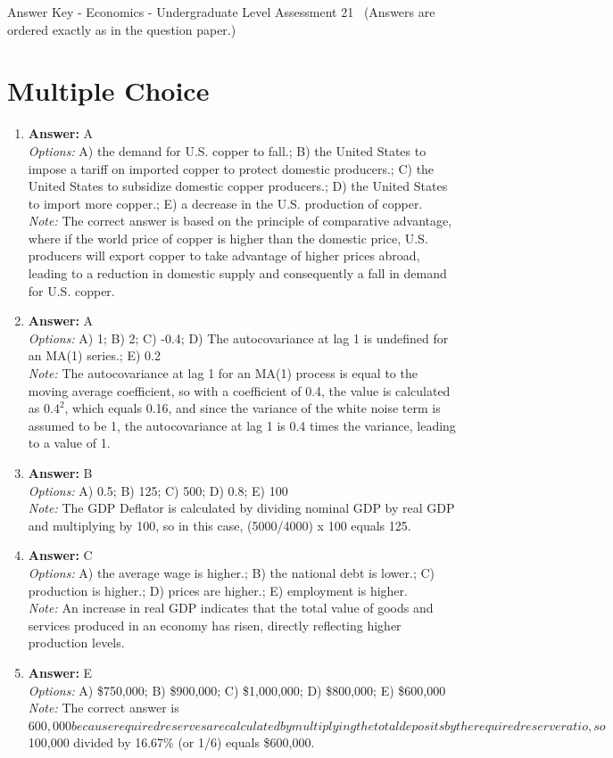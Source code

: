 \documentclass[12pt]{article}
\begin{document}
\begin{center}
Answer Key - Economics - Undergraduate Level Assessment 21 \
\small (Answers are ordered exactly as in the question paper.)
\end{center}

\section*{Multiple Choice}
\begin{enumerate}[label=\arabic*.]
\item \textbf{Answer:} A
\\ \textit{Options:} A) the demand for U.S. copper to fall.; B) the United States to impose a tariff on imported copper to protect domestic producers.; C) the United States to subsidize domestic copper producers.; D) the United States to import more copper.; E) a decrease in the U.S. production of copper.
\\ \textit{Note:} The correct answer is based on the principle of comparative advantage, where if the world price of copper is higher than the domestic price, U.S. producers will export copper to take advantage of higher prices abroad, leading to a reduction in domestic supply and consequently a fall in demand for U.S. copper.
\item \textbf{Answer:} A
\\ \textit{Options:} A) 1; B) 2; C) -0.4; D) The autocovariance at lag 1 is undefined for an MA(1) series.; E) 0.2
\\ \textit{Note:} The autocovariance at lag 1 for an MA(1) process is equal to the moving average coefficient, so with a coefficient of 0.4, the value is calculated as 0.$4^2$, which equals 0.16, and since the variance of the white noise term is assumed to be 1, the autocovariance at lag 1 is 0.4 times the variance, leading to a value of 1.
\item \textbf{Answer:} B
\\ \textit{Options:} A) 0.5; B) 125; C) 500; D) 0.8; E) 100
\\ \textit{Note:} The GDP Deflator is calculated by dividing nominal GDP by real GDP and multiplying by 100, so in this case, (5000/4000) x 100 equals 125.
\item \textbf{Answer:} C
\\ \textit{Options:} A) the average wage is higher.; B) the national debt is lower.; C) production is higher.; D) prices are higher.; E) employment is higher.
\\ \textit{Note:} An increase in real GDP indicates that the total value of goods and services produced in an economy has risen, directly reflecting higher production levels.
\item \textbf{Answer:} E
\\ \textit{Options:} A) \$750,000; B) \$900,000; C) \$1,000,000; D) \$800,000; E) \$600,000
\\ \textit{Note:} The correct answer is $600,000 because required reserves are calculated by multiplying the total deposits by the required reserve ratio, so $100,000 divided by 16.67\% (or 1/6) equals \$600,000.
\end{enumerate}
\end{document}
